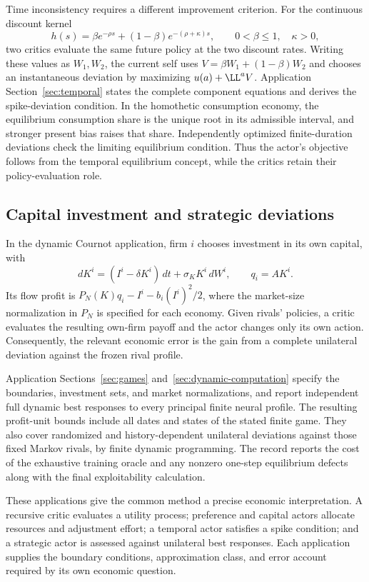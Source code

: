 Time inconsistency requires a different improvement criterion. For the continuous discount kernel
\[
 h(s)=\beta e^{-\rho s}+(1-\beta)e^{-(\rho+\kappa)s},
 \qquad 0<\beta\leq1,\quad\kappa>0,
\]
two critics evaluate the same future policy at the two discount rates. Writing these values as $W_1,W_2$, the current self uses $V=\beta W_1+(1-\beta)W_2$ and chooses an instantaneous deviation by maximizing $u(a)+\LL^a V$. Application Section~\ref{sec:temporal} states the complete component equations and derives the spike-deviation condition. In the homothetic consumption economy, the equilibrium consumption share is the unique root in its admissible interval, and stronger present bias raises that share. Independently optimized finite-duration deviations check the limiting equilibrium condition. Thus the actor's objective follows from the temporal equilibrium concept, while the critics retain their policy-evaluation role.

\subsection{Capital investment and strategic deviations}
In the dynamic Cournot application, firm $i$ chooses investment in its own capital, with
\[
 dK^i=(I^i-\delta K^i)\,dt+\sigma_KK^i\,dW^i,
 \qquad q_i=AK^i.
\]
Its flow profit is $P_N(K)q_i-I^i-b_i(I^i)^2/2$, where the market-size normalization in $P_N$ is specified for each economy. Given rivals' policies, a critic evaluates the resulting own-firm payoff and the actor changes only its own action. Consequently, the relevant economic error is the gain from a complete unilateral deviation against the frozen rival profile.

Application Sections~\ref{sec:games} and~\ref{sec:dynamic-computation} specify the boundaries, investment sets, and market normalizations, and report independent full dynamic best responses to every principal finite neural profile. The resulting profit-unit bounds include all dates and states of the stated finite game. They also cover randomized and history-dependent unilateral deviations against those fixed Markov rivals, by finite dynamic programming. The record reports the cost of the exhaustive training oracle and any nonzero one-step equilibrium defects along with the final exploitability calculation.

These applications give the common method a precise economic interpretation. A recursive critic evaluates a utility process; preference and capital actors allocate resources and adjustment effort; a temporal actor satisfies a spike condition; and a strategic actor is assessed against unilateral best responses. Each application supplies the boundary conditions, approximation class, and error account required by its own economic question.
